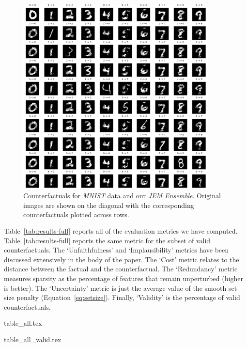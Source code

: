 \documentclass{article}
\begin{document}
\begin{figure}
  \centering
  \includegraphics[width=0.9\textwidth]{../artifacts/results/images/mnist_eccco_all_digits.png}
  \caption{Counterfactuals for \textit{MNIST} data and our \textit{JEM Ensemble}. Original images are shown on the diagonal with the corresponding counterfactuals plotted across rows.}\label{fig:mnist-eccco}
\end{figure}

Table~\ref{tab:results-full} reports all of the evaluation metrics we have computed. Table~\ref{tab:results-full} reports the same metric for the subset of valid counterfactuals. The `Unfaithfulness' and `Implausibility' metrics have been discussed extensively in the body of the paper. The `Cost' metric relates to the distance between the factual and the counterfactual. The `Redundancy' metric measures sparsity as the percentage of features that remain unperturbed (higher is better). The `Uncertainty' metric is just the average value of the smooth set size penalty (Equation~\ref{eq:setsize}). Finally, `Validity' is the percentage of valid counterfactuals. 

{table_all.tex}

{table_all_valid.tex}
\end{document}
